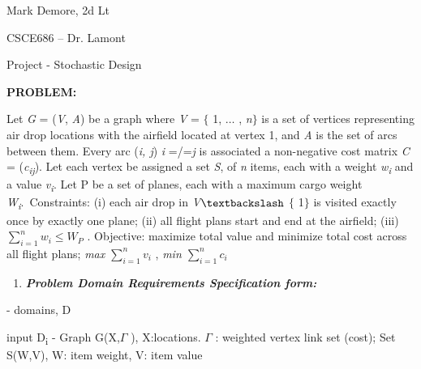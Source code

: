 \documentclass[12pt]{article}
\renewcommand{\_}{\kern-1.5pt\textunderscore\kern-1.5pt}
\begin{document}
Mark Demore, 2d Lt\par

CSCE686 – Dr. Lamont\par

Project - Stochastic Design\par

\textbf{PROBLEM:}\par

Let \textit{G} = (\textit{V}, \textit{A}) be a graph where \textit{V} = $ \{ $ 1, $ \ldots $ , \textit{n}$ \} $  is a set of vertices representing air drop locations with the airfield located at vertex 1, and \textit{A} is the set of arcs between them. Every arc (\textit{i, j}) \textit{i} =/=\textit{j} is associated a non-negative cost matrix \textit{C} = (\textit{c\textsubscript{ij}}). Let each vertex be assigned a set \textit{S},\textit{ }of \textit{n} items, each with a weight \textit{w\textsubscript{i}} and a value \textit{v\textsubscript{i}}. Let P be a set of planes, each with a maximum cargo weight \textit{W\textsubscript{i}}.\ Constraints:  (i) each air drop in \textit{V}$\textbackslash$ $ \{ $ 1$ \} $  is visited exactly once by exactly one plane; (ii) all flight plans start and end at the airfield; (iii)  \(  \sum _{i=1}^{n}w_{i}  \leq W_{P} \) . Objective: maximize total value and minimize total cost across all flight plans; \textit{max  \(  \sum _{i=1}^{n}v_{i} \) }, \textit{min  \(  \sum _{i=1}^{n}c_{i} \) }\par

\setlength{\parskip}{18.12pt}
\begin{enumerate}
	\item \textbf{\textit{Problem Domain Requirements Specification form:}}
\end{enumerate}\par

\setlength{\parskip}{8.04pt}
\begin{adjustwidth}{0.5in}{0.0in}
- domains, D \par

\end{adjustwidth}

\begin{adjustwidth}{0.5in}{0.0in}
\tab input D\textsubscript{i }- Graph G(X,$ \Gamma $ ), X:locations. $ \Gamma $ : weighted vertex link set (cost); Set S(W,V), W: item weight, V: item value\par

\end{adjustwidth}
\end{document}
